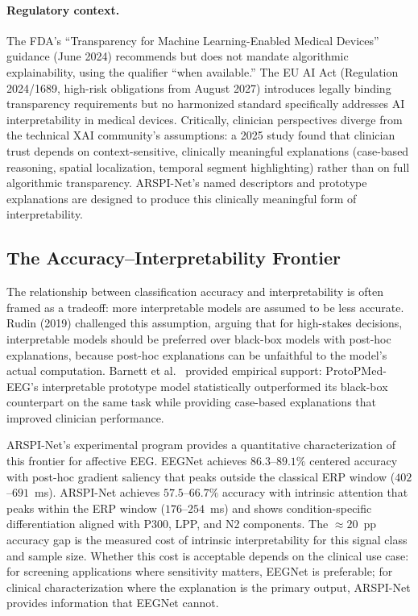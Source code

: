 \paragraph{Regulatory context.} The FDA's ``Transparency for Machine Learning-Enabled Medical Devices'' guidance (June 2024) recommends but does not mandate algorithmic explainability, using the qualifier ``when available.'' The EU AI Act (Regulation 2024/1689, high-risk obligations from August 2027) introduces legally binding transparency requirements but no harmonized standard specifically addresses AI interpretability in medical devices. Critically, clinician perspectives diverge from the technical XAI community's assumptions: a 2025 study found that clinician trust depends on context-sensitive, clinically meaningful explanations (case-based reasoning, spatial localization, temporal segment highlighting) rather than on full algorithmic transparency. ARSPI-Net's named descriptors and prototype explanations are designed to produce this clinically meaningful form of interpretability.

\subsection{The Accuracy--Interpretability Frontier}
\label{sec:accuracy_interpretability}

The relationship between classification accuracy and interpretability is often framed as a tradeoff: more interpretable models are assumed to be less accurate. Rudin (2019) challenged this assumption, arguing that for high-stakes decisions, interpretable models should be preferred over black-box models with post-hoc explanations, because post-hoc explanations can be unfaithful to the model's actual computation. Barnett et al.\ \cite{barnett_protopmed_2024} provided empirical support: ProtoPMed-EEG's interpretable prototype model statistically outperformed its black-box counterpart on the same task while providing case-based explanations that improved clinician performance.

ARSPI-Net's experimental program provides a quantitative characterization of this frontier for affective EEG. EEGNet achieves $86.3$--$89.1\%$ centered accuracy with post-hoc gradient saliency that peaks outside the classical ERP window ($402$--$691$~ms). ARSPI-Net achieves $57.5$--$66.7\%$ accuracy with intrinsic attention that peaks within the ERP window ($176$--$254$~ms) and shows condition-specific differentiation aligned with P300, LPP, and N2 components. The $\approx 20$~pp accuracy gap is the measured cost of intrinsic interpretability for this signal class and sample size. Whether this cost is acceptable depends on the clinical use case: for screening applications where sensitivity matters, EEGNet is preferable; for clinical characterization where the explanation is the primary output, ARSPI-Net provides information that EEGNet cannot.

